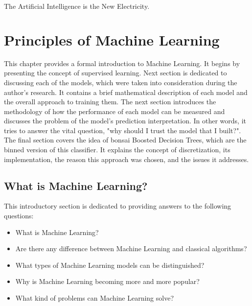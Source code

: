 \begin{savequote}[75mm] 
The Artificial Intelligence is the New Electricity.
\end{savequote}

\chapter{Principles of Machine Learning}
\label{chapter:ML}
This chapter provides a formal introduction to Machine Learning. It begins by presenting the concept of supervised learning. Next section is dedicated to discussing each of the models, which were taken into consideration during the author's research. It contains a brief mathematical description of each model and the overall approach to training them. The next section introduces the methodology of how the performance of each model can be measured and discusses the problem of the model's prediction interpretation. In other words, it tries to answer the vital question, "why should I trust the model that I built?". 
The final section covers the idea of bonsai Boosted Decision Trees, which are the binned version of this classifier. It explains the concept of discretization, its implementation, the reason this approach was chosen, and the issues it addresses. 

\section{What is Machine Learning?}
This introductory section is dedicated to providing answers to the following questions: 
\begin{itemize}
    \item What is Machine Learning? 
    \item Are there any difference between Machine Learning and classical algorithms? 
    \item What types of Machine Learning models can be distinguished? 
    \item Why is Machine Learning becoming more and more popular? 
    \item What kind of problems can Machine Learning solve? 
\end{itemize}

